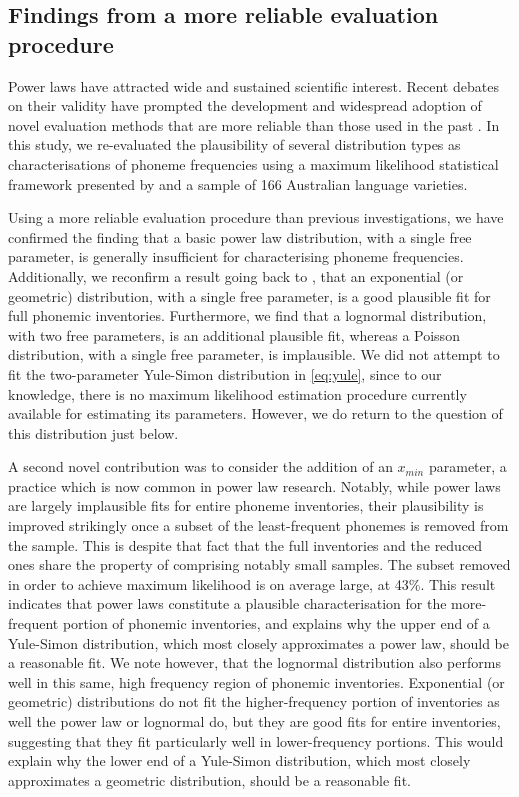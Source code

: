 \hypertarget{findings-from-a-more-reliable-evaluation-procedure}{%
\subsection{Findings from a more reliable evaluation procedure}\label{findings-from-a-more-reliable-evaluation-procedure}}

Power laws have attracted wide and sustained scientific interest. Recent debates on their validity have prompted the development and widespread adoption of novel evaluation methods that are more reliable than those used in the past \autocites{clauset_power-law_2009}{stumpf_critical_2012}. In this study, we re-evaluated the plausibility of several distribution types as characterisations of phoneme frequencies using a maximum likelihood statistical framework presented by \textcite{clauset_power-law_2009} and a sample of 166 Australian language varieties.

Using a more reliable evaluation procedure than previous investigations, we have confirmed the finding that a basic power law distribution, with a single free parameter, is generally insufficient for characterising phoneme frequencies. Additionally, we reconfirm a result going back to \textcite{sigurd_rank-frequency_1968}, that an exponential (or geometric) distribution, with a single free parameter, is a good plausible fit for full phonemic inventories. Furthermore, we find that a lognormal distribution, with two free parameters, is an additional plausible fit, whereas a Poisson distribution, with a single free parameter, is implausible. We did not attempt to fit the two-parameter Yule-Simon distribution in \eqref{eq:yule}, since to our knowledge, there is no maximum likelihood estimation procedure currently available for estimating its parameters. However, we do return to the question of this distribution just below.

A second novel contribution was to consider the addition of an \(x_{min}\) parameter, a practice which is now common in power law research. Notably, while power laws are largely implausible fits for entire phoneme inventories, their plausibility is improved strikingly once a subset of the least-frequent phonemes is removed from the sample. This is despite that fact that the full inventories and the reduced ones share the property of comprising notably small samples. The subset removed in order to achieve maximum likelihood is on average large, at 43\%. This result indicates that power laws constitute a plausible characterisation for the more-frequent portion of phonemic inventories, and explains why the upper end of a Yule-Simon distribution, which most closely approximates a power law, should be a reasonable fit. We note however, that the lognormal distribution also performs well in this same, high frequency region of phonemic inventories. Exponential (or geometric) distributions do not fit the higher-frequency portion of inventories as well the power law or lognormal do, but they are good fits for entire inventories, suggesting that they fit particularly well in lower-frequency portions. This would explain why the lower end of a Yule-Simon distribution, which most closely approximates a geometric distribution, should be a reasonable fit.

